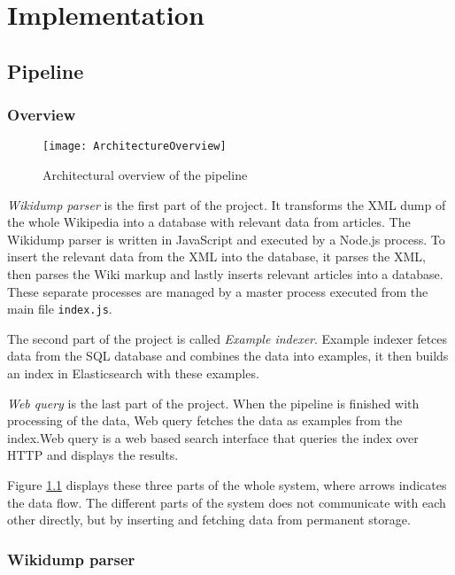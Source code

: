 
\chapter{Implementation}\label{cap_4}

\section{Pipeline}

\subsection{Overview}

\begin{figure}[h]
\caption{Architectural overview of the pipeline}
\texttt{[image: ArchitectureOverview]}
\label{fig:pipeline_arch}
\end{figure}


\textit{Wikidump parser} is the first part of the project. It transforms the XML dump of the whole Wikipedia into a database with relevant data from articles. The Wikidump parser is written in JavaScript and executed by a Node.js process. To insert the relevant data from the XML into the database, it parses the XML, then parses the Wiki markup and lastly inserts relevant articles into a database. These separate processes are managed by a master process executed from the main file \texttt{index.js}.

The second part of the project is called \textit{Example indexer}. Example indexer fetces data from the SQL database and combines the data into examples, it then builds an index in Elasticsearch with these examples.

\textit{Web query} is the last part of the project. When the pipeline is finished with processing of the data, Web query fetches the data as examples from the index.Web query is a web based search interface that queries the index over HTTP and displays the results.

Figure \ref{fig:pipeline_arch} displays these three parts of the whole system, where arrows indicates the data flow. The different parts of the system does not communicate with each other directly, but by inserting and fetching data from permanent storage. 


\subsection{Wikidump parser}

